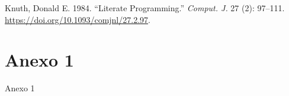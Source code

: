 \documentclass[
  a4paper,
  DIV=11,
  numbers=noendperiod]{scrreprt}
\newlength{\cslhangindent}
\newlength{\cslentryspacingunit} %
\newenvironment{CSLReferences}[2] %
 {%
  \setlength{\parindent}{0pt}
  \ifodd #1
  \let\oldpar\par
  \def\par{\hangindent=\cslhangindent\oldpar}
  \fi
  \setlength{\parskip}{#2\cslentryspacingunit}
 }%
 {}
\begin{document}

\hypertarget{refs}{}
\begin{CSLReferences}{1}{0}
\leavevmode{}%
Knuth, Donald E. 1984. {``Literate Programming.''} \emph{Comput. J.} 27
(2): 97--111. \url{https://doi.org/10.1093/comjnl/27.2.97}.

\end{CSLReferences}

\cleardoublepage
{}
{}
\appendix

\hypertarget{anexo-1}{%
\chapter{Anexo 1}\label{anexo-1}}

Anexo 1



\printindex
\end{document}
